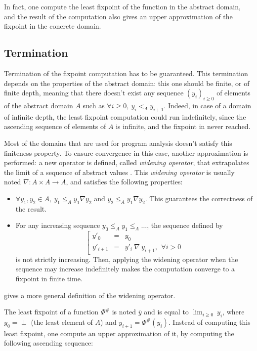 \documentclass[a4paper,english,titlepage,11pt]{article}
\newcommand*\system[1]{\left[ \begin{array}{lllll}#1 \end{array}\right.}
\begin{document}
In fact, one compute the least fixpoint of the function in the abstract
domain, and the result of the computation also gives an upper approximation of
the fixpoint in the concrete domain.


\subsection{Termination}

Termination of the fixpoint computation has to be guaranteed. This termination
depends on the properties of the abstract domain:
this one should be finite, or of finite depth, meaning that there doesn't exist
any sequence $(y_i)_{i \geq 0}$ of elements of the abstract domain $A$ such as
$\forall i \geq 0,\ y_i <_A y_{i+1}$. Indeed, in case of a domain of infinite
depth, the least fixpoint
computation could run indefinitely, since the ascending sequence of elements of
$A$ is infinite, and the fixpoint in never reached.


Most of the domains that are used for program analysis doesn't satisfy this
finiteness property. To ensure convergence in this case, another approximation
is performed: a new operator is defined, called \emph{widening operator}, that
extrapolates the limit of a sequence of abstract values
\cite{CC77,CousotCousot92-4}. This \emph{widening
operator} is usually noted $\nabla: A \times A \rightarrow A$, and satisfies
the following properties:

\begin{itemize}
\item $\forall y_1, y_2 \in A,\ y_1 \leq_A y_1 \nabla y_2$ and $y_2 \leq_A y_1
\nabla y_2$. This guarantees the correctness of the result.
\item For any increasing sequence $y_0 \leq_A y_1 \leq_A \dots$, the sequence
defined by 
$$\system{
y'_0 & = &  y_0 \\
y'_{i+1} & = &  y'_i\ \nabla\ y_{i+1},\ \  \forall i > 0
}$$
is not strictly increasing. Then, applying the widening operator when the
sequence may increase indefinitely makes the computation converge to a fixpoint
in finite time. 
\end{itemize}

\cite{Monniaux_HOSC09} gives a more general definition of the widening operator.

The least fixpoint of a function $\Phi^\#$ is noted $\overline{y}$ and is equal
to $\displaystyle \lim_{i \geq 0}\ y_i$, where $y_0 = \perp$ (the least element
of $A$) and $y_{i+1} = \Phi^\# (y_i)$. Instead of computing this least fixpoint,
one compute an upper approximation of it, by computing the following ascending
sequence:
\end{document}
